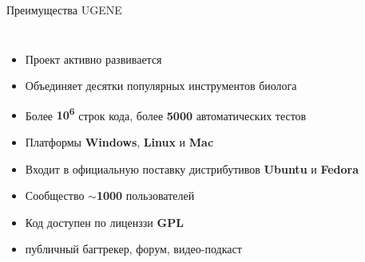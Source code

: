 \documentclass[utf8, professionalfonts]{beamer}
\begin{document}
\begin{frame}{Преимущества UGENE}

\begin{columns}[c]
		\begin{itemize}
			\item Проект активно развивается
			\item Объединяет десятки популярных инструментов биолога
			\item Более {\bf 10\textsuperscript{6}} строк кода, более {\bf 5000} автоматических тестов
			\item Платформы {\bf Windows}, {\bf Linux} и {\bf Mac}
			\item Входит в официальную поставку дистрибутивов {\bf Ubuntu} и {\bf Fedora}
			\item Сообщество {\bf $\sim$1000} пользователей
			\item Код доступен по лиценззи {\bf GPL} 
			\item публичный багтрекер, форум, видео-подкаст
		\end{itemize}
	
\end{columns}

\end{frame}
\end{document}
